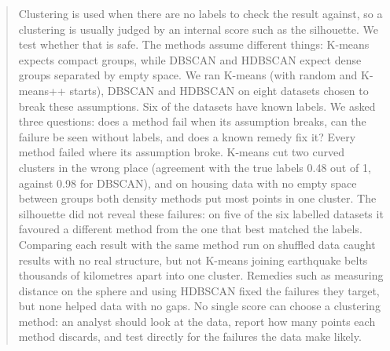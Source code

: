 \begin{abstract}
\noindent
Clustering is used when there are no labels to check the result against, so a clustering is usually
judged by an internal score such as the silhouette. We test whether that is safe. The methods assume
different things: K-means expects compact groups, while DBSCAN and HDBSCAN expect dense groups separated
by empty space. We ran K-means (with random and K-means++ starts), DBSCAN and HDBSCAN
on eight datasets chosen to break these assumptions. Six of the datasets have known labels. We asked
three questions: does a method fail when its assumption breaks, can the failure be seen without labels,
and does a known remedy fix it? Every method failed where its assumption broke. K-means cut two curved
clusters in the wrong place (agreement with the true labels 0.48 out of 1, against 0.98 for DBSCAN), and
on housing data with no empty space between groups both density methods put most points in one cluster.
The silhouette did not reveal these failures: on five of the six labelled datasets it favoured a
different method from the one that best matched the labels. Comparing each result with the same method
run on shuffled data caught results with no real structure, but not K-means joining earthquake belts
thousands of kilometres apart into one cluster. Remedies such as measuring distance on the sphere and
using HDBSCAN fixed the failures they target, but none helped data with no gaps. No single score can
choose a clustering method: an analyst should look at the data, report how many points each method
discards, and test directly for the failures the data make likely.
\end{abstract}
